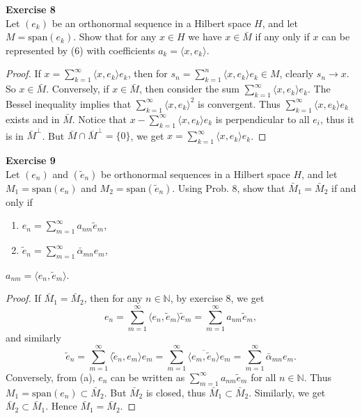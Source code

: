 \documentclass[12pt, a4paper]{article}
\theoremstyle{plain}
\newcommand{\N}{\mathbb{N}}
\newenvironment{exercise}[2][Exercise]
    { \begin{mdframed}[backgroundcolor=gray!20] \textbf{#1 #2} \\}
    {  \end{mdframed}}
\begin{document}
\pagebreak

\begin{exercise}{8}
Let $(e_k)$ be an orthonormal sequence in a Hilbert space $H$, and let $M=\text{span}(e_k)$. Show that for any $x\in H$ we have $x\in \bar M$ if any only if $x$ can be represented by (6) with coefficients $a_k=\langle{x,e_k}\rangle$.
\end{exercise}
	\begin{proof}
	If $x = \sum_{k=1}^{\infty}{\langle{x,e_k}\rangle e_k}$, then for $s_n = \sum_{k=1}^{n}{\langle{x,e_k}\rangle e_k}\in M$, clearly $s_n\rightarrow x$. So $x\in \bar M$. Conversely, if $x\in \bar M$, then consider the sum $\sum_{k=1}^{\infty}{\langle{x,e_k}\rangle e_k}$. The Bessel inequality implies that $\sum_{k=1}^{\infty}{\langle{x,e_k}\rangle^2}$ is convergent. Thus $\sum_{k=1}^{\infty}{\langle{x,e_k}\rangle e_k}$ exists and in $\bar M$. Notice that $x-\sum_{k=1}^{\infty}{\langle{x,e_k}\rangle e_k}$ is perpendicular to all $e_i$, thus it is in $\bar M ^\perp$. But $\bar M\cap \bar M^\perp = \{0\}$, we get $x = \sum_{k=1}^{\infty}{\langle{x,e_k}\rangle e_k}$.
	\end{proof}

\begin{exercise}{9}
Let $(e_n)$ and $(\tilde{e}_n)$ be orthonormal sequences in a Hilbert space $H$, and let $M_1=\text{span}(e_n)$ and $M_2=\text{span}(\tilde{e}_n)$. Using Prob. 8, show that $\bar M_1=\bar M_2$ if and only if
\begin{enumerate}[label=(\alph*)]
\item $e_n=\sum_{m=1}^{\infty}{a_{nm}\tilde{e}_m}$,
\item $\tilde{e}_n=\sum_{m=1}^{\infty}{\bar{\alpha}_{mn}e_m}$,
\end{enumerate}
$a_{nm}=\langle{e_n,\tilde e_m}\rangle$.
\end{exercise}
	\begin{proof}
	If $\bar M_1 = \bar M_2$, then for any $n\in \N$, by exercise 8, we get 
	\[
	e_n=\sum_{m=1}^{\infty}{\langle{e_n,\tilde e_m}\rangle\tilde{e}_m}=\sum_{m=1}^{\infty}{a_{nm}\tilde{e}_m},
	\]
	and similarly 
	\[
	\tilde e_n=\sum_{m=1}^{\infty}{\langle{\tilde e_n, e_m}\rangle e_m}= \sum_{m=1}^{\infty}{\overline{\langle{e_m,\tilde e_n}\rangle }e_m}=\sum_{m=1}^{\infty}{\bar{\alpha}_{mn}e_m}.
	\]
	Conversely, from (a), $e_n$ can be written as $\sum_{m=1}^{\infty}{a_{nm}\tilde{e}_m}$ for all $n\in \N$. Thus $M_1 = \text{span}(e_n)\subset \bar M_2$. But $\bar M_2$ is closed, thus $\bar M_1\subset \bar M_2$. Similarly, we get $\bar M_2\subset \bar M_1$. Hence $\bar M_1 = \bar M_2$.
	\end{proof}
\end{document}
